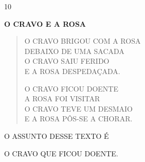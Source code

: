 \begin{escola}
\begin{escolha}
\item %
\end{escolha}





\num{10}

\textbf{O CRAVO E A ROSA}

\begin{verse}
O CRAVO BRIGOU COM A ROSA\\
DEBAIXO DE UMA SACADA\\
O CRAVO SAIU FERIDO\\
E A ROSA DESPEDAÇADA.

O CRAVO FICOU DOENTE\\
A ROSA FOI VISITAR\\
O CRAVO TEVE UM DESMAIO\\
E A ROSA PÔS-SE A CHORAR.
\end{verse}


O ASSUNTO DESSE TEXTO É

\begin{escolha}
\item O CRAVO QUE FICOU DOENTE.


\end{escolha}
\end{escola}
